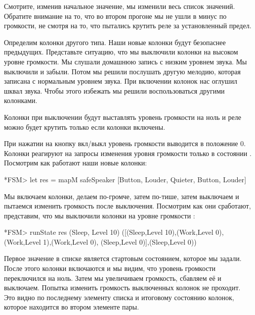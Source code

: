 Смотрите, изменив начальное значение, мы изменили весь список значений.
Обратите внимание на то, что во втором прогоне мы не ушли в минус по
громкости, не смотря на то, что пытались крутить реле за установленный
предел.

Определим колонки другого типа. Наши новые колонки будут безопаснее
предыдущих. Представьте ситуацию, что мы выключили колонки на высоком
уровне громкости. Мы слушали домашнюю запись с низким уровнем звука. Мы
выключили и забыли. Потом мы решили послушать другую мелодию, которая
записана с нормальным уровнем звука. При включении колонок нас оглушил
шквал звука. Чтобы этого избежать мы решили воспользоваться другими
колонками.

Колонки при выключении будут выставлять уровень громкости на ноль и реле
можно будет крутить только если колонки включены.



При нажатии на кнопку вкл/выкл уровень громкости выводится в положение
0. Колонки реагируют на запросы изменения уровня громкости только в
состоянии . Посмотрим как работают наши новые колонки:


\begin{code}
*FSM> let res = mapM safeSpeaker [Button, Louder, Quieter, Button, Louder]
\end{code}

Мы включаем колонки, делаем по-громче, затем по-тише, затем выключаем и
пытаемся изменить громкость после выключения. Посмотрим как они
сработают, представим, что мы выключили колонки на уровне громкости
:


\begin{code}
*FSM> runState res (Sleep, Level 10)
([(Sleep,Level 10),(Work,Level 0),(Work,Level 1),(Work,Level 0),
 (Sleep,Level 0)],(Sleep,Level 0))
\end{code}

Первое значение в списке является стартовым состоянием, которое мы
задали. После этого колонки включаются и мы видим, что уровень громкости
переключился на ноль. Затем мы увеличиваем громкость, сбавляем её и
выключаем. Попытка изменить громкость выключенных колонок не проходит.
Это видно по последнему элементу списка и итоговому состоянию колонок,
которое находится во втором элементе пары.

